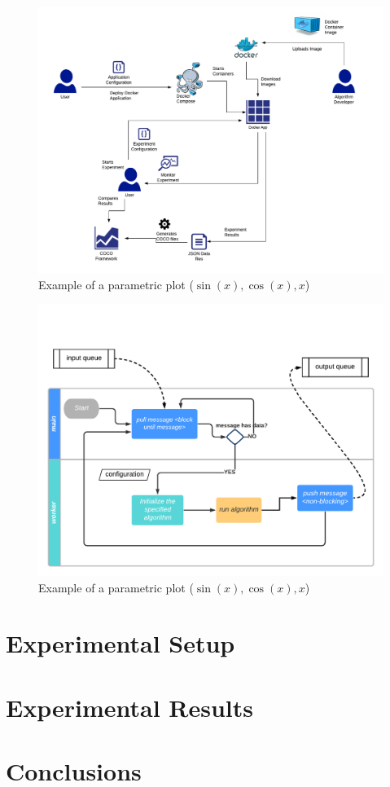 \documentclass[review]{elsarticle}
\begin{document}
\begin{figure}[h]
    \centering
    \includegraphics[width=\textwidth]{experiment_flow}
    \caption{Example of a parametric plot ($\sin (x), \cos(x), x$)}
\end{figure}




\begin{figure}[h]
    \centering
    \includegraphics[width=\textwidth]{worker}
    \caption{Example of a parametric plot ($\sin (x), \cos(x), x$)}
\end{figure}



\section{Experimental Setup} 
\label{setup}

\section{Experimental Results} 
\label{results}

\section{Conclusions} 
\label{conclusions}



\end{document}
